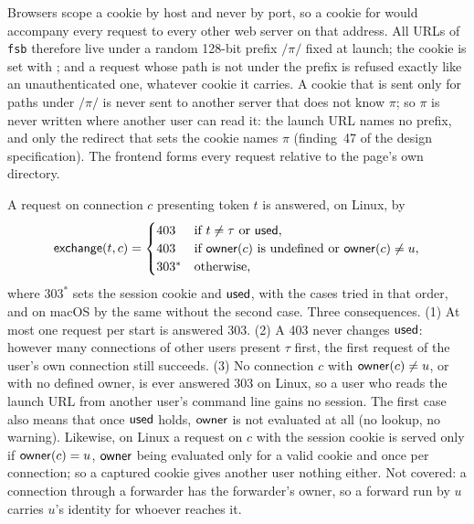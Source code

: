 \begin{law}
\label{law:cookie-path}
Browsers scope a cookie by host and never by port, so a cookie for
 would accompany every request to every other web server on that
address.  All URLs of \texttt{fsb} therefore live under a random 128-bit prefix
$/\pi/$ fixed at launch; the cookie is set with ; and a
request whose path is not under the prefix is refused exactly like an
unauthenticated one, whatever cookie it carries.  A cookie that is sent only for
paths under $/\pi/$ is never sent to another server that does not know $\pi$;
so $\pi$ is never written where another user can read it: the launch URL names
no prefix, and only the redirect that sets the cookie names $\pi$ (finding~47
of the design specification).
The frontend forms every request relative to the page's own directory.
\end{law}

\begin{law}
\label{law:launch-owner}
A request on connection $c$ presenting token $t$ is answered, on Linux, by
\[
  \mathsf{exchange}(t,c) =
  \begin{cases}
    403 & \text{if } t\neq\tau \text{ or } \mathsf{used},\\
    403 & \text{if } \mathsf{owner}(c) \text{ is undefined or } \mathsf{owner}(c)\neq u,\\
    303^{*} & \text{otherwise,}
  \end{cases}
\]
where $303^{*}$ sets the session cookie and $\mathsf{used}$, with the cases tried in that order, and on macOS by the same without the second
case.  Three consequences.  (1) At most one request per start is answered 303.
(2) A 403 never changes $\mathsf{used}$: however many connections of other users present
$\tau$ first, the first request of the user's own connection still succeeds.
(3) No connection $c$ with $\mathsf{owner}(c)\neq u$, or with no defined owner, is ever
answered 303 on Linux, so a user who reads the launch URL from another user's
command line gains no session.  The first case also means that once $\mathsf{used}$
holds, $\mathsf{owner}$ is not evaluated at all (no lookup, no warning).  Likewise, on
Linux a request on $c$ with the session cookie is served only if $\mathsf{owner}(c)=u$,
$\mathsf{owner}$ being evaluated only for a valid cookie and once per connection; so a
captured cookie gives another user nothing either.  Not covered: a
connection through a forwarder has the forwarder's owner, so a forward run by $u$
carries $u$'s identity for whoever reaches it.
\end{law}


